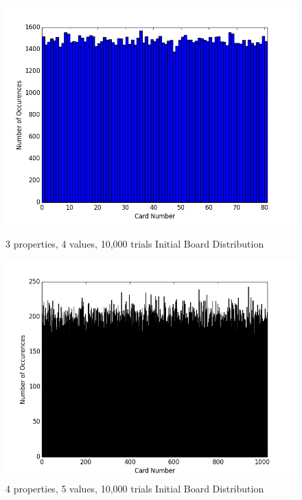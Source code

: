 \documentclass[pageno]{jpaper}
\begin{document}
\begin{figure}[htbb]
\begin{minipage}[b]{0.5\linewidth}
\centering
\includegraphics[width=.75\linewidth]{3p4v10000Init.png}
\caption{3 properties, 4 values, 10,000 trials Initial Board Distribution}
\label{fig:init1}
\end{minipage}
\hspace{0.5cm}
\begin{minipage}[b]{0.5\linewidth}
\centering
\includegraphics[width=.75\linewidth]{4p5v10000Init.png}
\caption{4 properties, 5 values, 10,000 trials Initial Board Distribution}
\label{fig:init2}
\end{minipage}
\end{figure}
\end{document}
